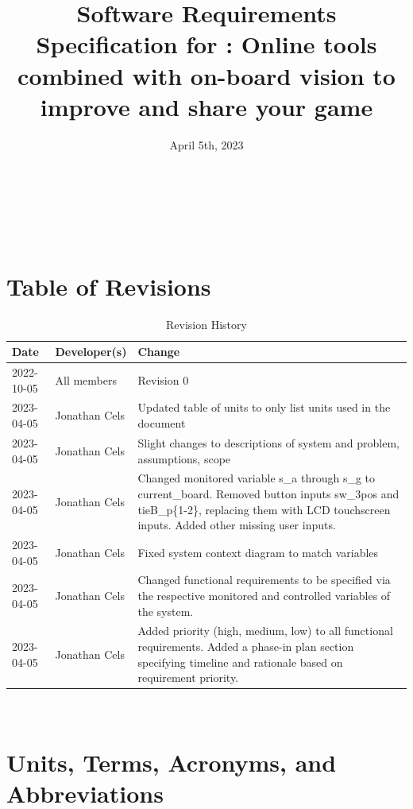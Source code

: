 \documentclass[12pt]{article}
\begin{document}
\title{Software Requirements Specification for \progname{}: Online tools combined with on-board vision to improve and share your game} 
\author{\authname}
\date{April 5th, 2023}
	
\maketitle

~\newpage

\tableofcontents

~\newpage

\section*{Table of Revisions}
\begin{table}[hp]
\caption{Revision History} \label{TblRevisionHistory}
\begin{tabularx}{\textwidth}{llX}
\toprule
\textbf{Date} & \textbf{Developer(s)} & \textbf{Change}\\
\midrule
2022-10-05 & All members & Revision 0\\
2023-04-05 & Jonathan Cels & Updated table of units to only list units used in the document\\
2023-04-05 & Jonathan Cels & Slight changes to descriptions of system and problem, assumptions, scope\\ 
2023-04-05 & Jonathan Cels & Changed monitored variable s\_a through s\_g to current\_board. Removed button inputs sw\_3pos and tieB\_p\{1-2\}, replacing them with LCD touchscreen inputs. Added other missing user inputs.\\
2023-04-05 & Jonathan Cels & Fixed system context diagram to match variables\\
2023-04-05 & Jonathan Cels & Changed functional requirements to be specified via the respective monitored and controlled variables of the system.\\
2023-04-05 & Jonathan Cels & Added priority (high, medium, low) to all functional requirements. Added a phase-in plan section specifying timeline and rationale based on requirement priority.\\
\bottomrule
\end{tabularx}
\end{table}

~\newpage

\section{Units, Terms, Acronyms, and Abbreviations}
\end{document}
